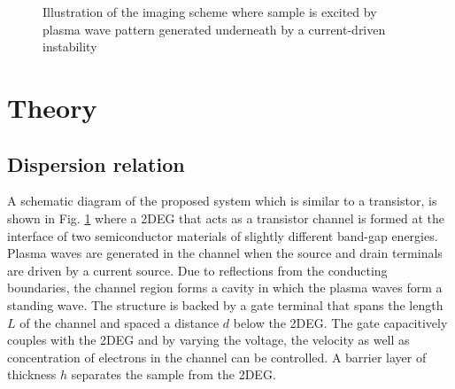 \documentclass[11pt]{article}
\begin{document}
%
\begin{figure}[t!]
  \centering
  \def\svgwidth{\linewidth}
  
  \caption{Illustration of the imaging scheme where sample is excited by plasma wave pattern generated underneath by a current-driven instability}
  \label{fig:struct}
\end{figure}
%
\section{Theory}
\subsection{Dispersion relation}
%
A schematic diagram of the proposed system which is similar to a transistor, is shown in Fig. \ref{fig:struct} where a 2DEG that acts as a transistor channel is formed at the interface of two semiconductor materials of slightly different band-gap energies. Plasma waves are generated in the channel when the source and drain terminals are driven by a current source. Due to reflections from the conducting boundaries, the channel region forms a cavity in which the plasma waves form a standing wave. The structure is backed by a gate terminal that spans the length $L$ of the channel and spaced a distance $d$ below the 2DEG. The gate capacitively couples with the 2DEG and by varying the voltage, the velocity as well as concentration of electrons in the channel can be controlled. A barrier layer of thickness $h$ separates the sample from the 2DEG.
\end{document}

